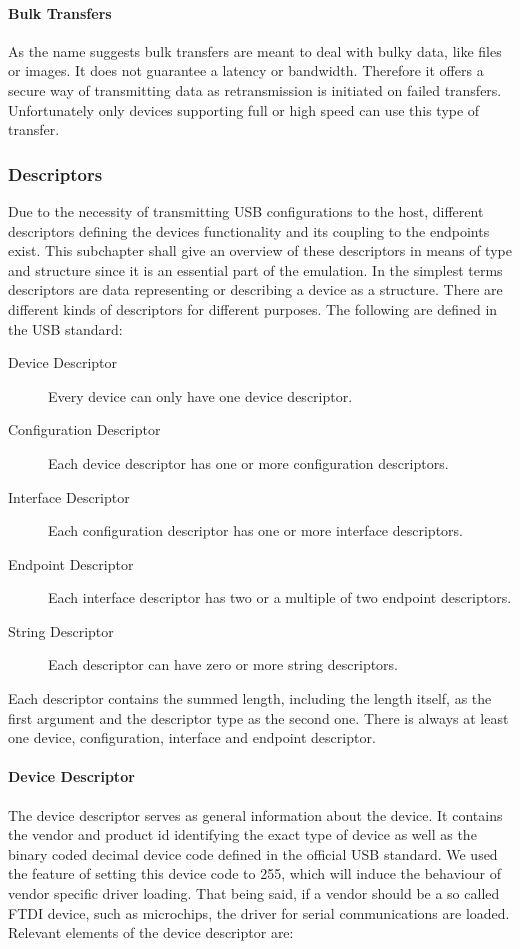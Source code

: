 \paragraph{Bulk Transfers}
As the name suggests bulk transfers are meant to deal with bulky data, like files or images. It does not guarantee a latency or 
bandwidth. Therefore it offers a secure way of transmitting data as retransmission is initiated on failed transfers. Unfortunately 
only devices supporting full or high speed can use this type of transfer. 

\subsubsection{Descriptors}
Due to the necessity of transmitting USB configurations to the host, different descriptors defining the devices functionality and its coupling to
the endpoints exist. This subchapter shall give an overview of these descriptors in means of type and structure since it is an essential part of the 
emulation. 
In the simplest terms descriptors are data representing or describing a device as a structure. There are different kinds of descriptors for different 
purposes. The following are defined in the USB standard:

\begin{description}
 \item[Device Descriptor] Every device can only have one device descriptor.
 \item[Configuration Descriptor] Each device descriptor has one or more configuration descriptors.
 \item[Interface Descriptor] Each configuration descriptor has one or more interface descriptors.
 \item[Endpoint  Descriptor] Each interface descriptor has two or a multiple of two endpoint descriptors.
 \item[String Descriptor] Each descriptor can have zero or more string descriptors.
\end{description}
Each descriptor contains the summed length, including the length itself, as the first argument and the descriptor type as the second one. There is 
always at least one device, configuration, interface and endpoint descriptor.

\paragraph{Device Descriptor}
The device descriptor serves as general information about the device. It contains the vendor and product id identifying the exact type of device as 
well as the binary coded decimal device code defined in the official USB standard. We used the feature of setting this device code to 255, which will 
induce the behaviour of vendor specific driver loading. That being said, if a vendor should be a so called FTDI device, such as microchips, the 
driver for serial communications are loaded. Relevant elements of the device descriptor are: 

